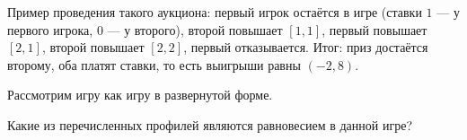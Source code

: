 Пример проведения такого аукциона: первый игрок остаётся в игре (ставки $1$ --- у первого игрока, $0$ --- у второго), второй повышает $[1,1]$, первый повышает $[2,1]$, второй повышает $[2,2]$, первый отказывается. Итог: приз достаётся второму, оба платят ставки, то есть выигрыши равны $(-2,8)$.

Рассмотрим игру как игру в развернутой форме.

Какие из перечисленных профилей являются равновесием в данной игре?

\begin{enumerate}[label=$\square$]
	
	
	

\end{enumerate}
